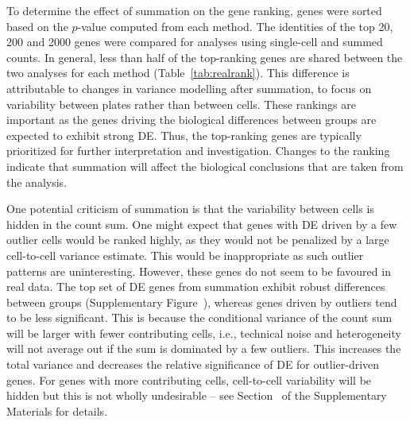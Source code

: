 \documentclass[oupdraft]{bio}
\begin{document}
To determine the effect of summation on the gene ranking, genes were sorted based on the $p$-value computed from each method.
The identities of the top 20, 200 and 2000 genes were compared for analyses using single-cell and summed counts.
In general, less than half of the top-ranking genes are shared between the two analyses for each method (Table~\ref{tab:realrank}).
This difference is attributable to changes in variance modelling after summation, to focus on variability between plates rather than between cells.
These rankings are important as the genes driving the biological differences between groups are expected to exhibit strong DE.
Thus, the top-ranking genes are typically prioritized for further interpretation and investigation.
Changes to the ranking indicate that summation will affect the biological conclusions that are taken from the analysis.

One potential criticism of summation is that the variability between cells is hidden in the count sum.
One might expect that genes with DE driven by a few outlier cells would be ranked highly, as they would not be penalized by a large cell-to-cell variance estimate.
This would be inappropriate as such outlier patterns are uninteresting.
However, these genes do not seem to be favoured in real data.
The top set of DE genes from summation exhibit robust differences between groups (Supplementary Figure~\suppexpprof{}), whereas genes driven by outliers tend to be less significant.
This is because the conditional variance of the count sum will be larger with fewer contributing cells, 
    i.e., technical noise and heterogeneity will not average out if the sum is dominated by a few outliers.
This increases the total variance and decreases the relative significance of DE for outlier-driven genes.
For genes with more contributing cells, cell-to-cell variability will be hidden but this is not wholly undesirable 
    -- see Section~\supphiddenvar{} of the Supplementary Materials for details.

\end{document}
